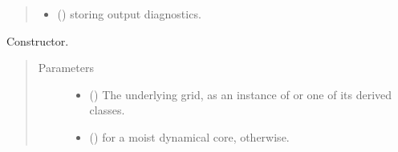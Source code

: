 \documentclass[letterpaper,10pt,english]{sphinxmanual}
\begin{document}
\begin{fulllineitems}
\begin{fulllineitems}
\begin{quote}
\begin{description}
\begin{itemize}
\item {} 
 () \textendash{} {\hyperref[\detokenize{api:storages.grid_data.GridData}]{}} storing output diagnostics.

\end{itemize}


\end{description}\end{quote}

\end{fulllineitems}


\begin{fulllineitems}
\label{\detokenize{api:dycore.dycore.DynamicalCore.__init__}}
Constructor.
\begin{quote}\begin{description}
\item[{Parameters}] \leavevmode\begin{itemize}
\item {} 
 () \textendash{} The underlying grid, as an instance of {\hyperref[\detokenize{api:grids.grid_xyz.GridXYZ}]{}} or one of its derived classes.

\item {} 
 () \textendash{}  for a moist dynamical core,  otherwise.

\end{itemize}

\end{description}\end{quote}

\end{fulllineitems}



\end{fulllineitems}
\end{document}
